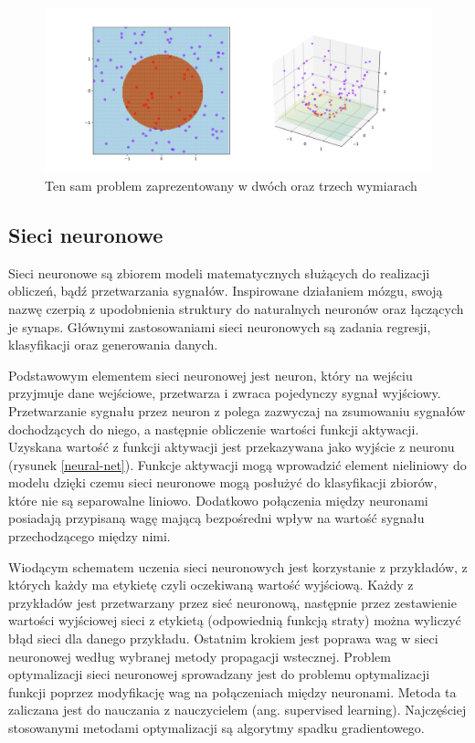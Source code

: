 \documentclass[a4paper, twoside, 11pt, openright]{article}
\begin{document}
\begin{figure}[H]
\centering \includegraphics[scale=0.2]{img/svm2.png}
\caption{Ten sam problem zaprezentowany w dwóch oraz trzech wymiarach \cite{wikisvm}}
\label{wiki_svm2}
\end{figure}


\subsection{Sieci neuronowe \cite{neural-nets}}

Sieci neuronowe są zbiorem modeli matematycznych służących do realizacji obliczeń, bądź przetwarzania sygnałów. Inspirowane działaniem mózgu, swoją nazwę czerpią z upodobnienia struktury do naturalnych neuronów oraz łączących je synaps. Głównymi zastosowaniami sieci neuronowych są zadania regresji, klasyfikacji oraz generowania danych. 

\bigskip

Podstawowym elementem sieci neuronowej jest neuron, który na wejściu przyjmuje dane wejściowe, przetwarza i zwraca pojedynczy sygnał wyjściowy. Przetwarzanie sygnału przez neuron z polega zazwyczaj na zsumowaniu sygnałów dochodzących do niego, a następnie obliczenie wartości funkcji aktywacji. Uzyskana wartość z funkcji aktywacji jest przekazywana jako wyjście z neuronu (rysunek \ref{neural-net}). Funkcje aktywacji mogą wprowadzić element nieliniowy do modelu dzięki czemu sieci neuronowe mogą posłużyć do klasyfikacji zbiorów, które nie są separowalne liniowo. Dodatkowo połączenia między neuronami posiadają przypisaną wagę mającą bezpośredni wpływ na wartość sygnału przechodzącego między nimi.

\bigskip

Wiodącym schematem uczenia sieci neuronowych jest korzystanie z przykładów, z których każdy ma etykietę czyli oczekiwaną wartość wyjściową. Każdy z przykładów jest przetwarzany przez sieć neuronową, następnie przez zestawienie wartości wyjściowej sieci z etykietą (odpowiednią funkcją straty) można wyliczyć błąd sieci dla danego przykładu. Ostatnim krokiem jest poprawa wag w sieci neuronowej według wybranej metody propagacji wstecznej. Problem optymalizacji sieci neuronowej sprowadzany jest do problemu optymalizacji funkcji poprzez modyfikację wag na połączeniach między neuronami. Metoda ta zaliczana jest do nauczania z nauczycielem (ang. supervised learning). Najczęściej stosowanymi metodami optymalizacji są algorytmy spadku gradientowego. 
\end{document}
